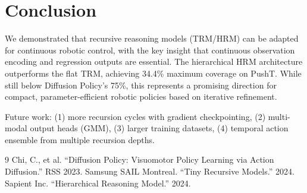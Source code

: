 \documentclass[11pt,a4paper]{article}
\begin{document}
\section{Conclusion}

We demonstrated that recursive reasoning models (TRM/HRM) can be adapted for continuous robotic control, with the key insight that continuous observation encoding and regression outputs are essential. The hierarchical HRM architecture outperforms the flat TRM, achieving 34.4\% maximum coverage on PushT. While still below Diffusion Policy's 75\%, this represents a promising direction for compact, parameter-efficient robotic policies based on iterative refinement.

Future work: (1) more recursion cycles with gradient checkpointing, (2) multi-modal output heads (GMM), (3) larger training datasets, (4) temporal action ensemble from multiple recursion depths.


\begin{thebibliography}{9}
 Chi, C., et al. ``Diffusion Policy: Visuomotor Policy Learning via Action Diffusion.'' RSS 2023.
 Samsung SAIL Montreal. ``Tiny Recursive Models.'' 2024.
 Sapient Inc. ``Hierarchical Reasoning Model.'' 2024.
\end{thebibliography}
\end{document}
